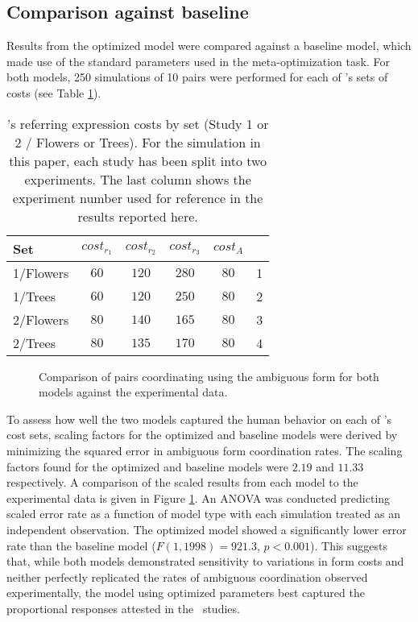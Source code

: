 \documentclass[a4paper,11pt]{article}
\begin{document}
\subsection{Comparison against baseline}
\label{sec:model_comparison}
Results from the optimized model were compared against a baseline model, which made use of the standard parameters used in the meta-optimization task. For both models, 250 simulations of 10 pairs were performed for each of \citeauthor{rohde2012}'s sets of costs (see Table \ref{table:2}).
\begin{table}[]
\begin{center}
    \begin{tabular}{l c c c c | c}
    Set & $cost_{r_1}$ & $cost_{r_2}$ & $cost_{r_3}$ & $cost_A$ & \\ \hline
    1/Flowers & $60$ & $120$ & $280$ & $80$ & 1\\ \hline
    1/Trees & $60$ & $120$ & $250$ & $80$ & 2\\ \hline
    2/Flowers & $80$ & $140$ & $165$ & $80$ & 3\\ \hline
    2/Trees & $80$ & $135$ & $170$ & $80$ & 4\\ 
    \end{tabular}
    \caption{\citeauthor{rohde2012}'s referring expression costs by set (Study 1 or 2 / Flowers or Trees). For the simulation in this paper, each study has  been split into two experiments. The last column shows the experiment number used for reference in the results reported here.}
    \label{table:2}
\end{center}
\end{table}

\begin{figure}[t]
\centering
\scalebox{.55}{}
\caption{Comparison of pairs coordinating using the ambiguous form for both models against the experimental data.}
\label{fig:model_comp}
\end{figure}

To assess how well the two models captured the human behavior on each of \citeauthor{rohde2012}'s cost sets, scaling factors for the optimized and baseline models were derived by minimizing the squared error in ambiguous form coordination rates. The scaling factors found for the optimized and baseline models were $2.19$ and $11.33$ respectively. A comparison of the scaled results from each model to the experimental data is given in Figure \ref{fig:model_comp}. An ANOVA was conducted predicting scaled error rate as a function of model type with each simulation treated as an independent observation. The optimized model showed a significantly lower error rate than the baseline model ($F(1, 1998) = 921.3$, $p<0.001$). This suggests that, while both models demonstrated sensitivity to variations in form costs and neither perfectly replicated the rates of ambiguous coordination observed experimentally, the model using optimized parameters best captured the proportional responses attested in the \citeauthor{rohde2012}\ studies. 
\end{document}
